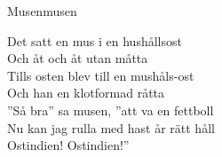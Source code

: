\begin{song}{Musen}{musen}
\begin{vers}
Det satt en mus i en hushållsost\\
Och åt och åt utan måtta\\
Tills osten blev till en mushåls-ost\\
Och han en klotformad råtta\\
''Så bra'' sa musen, ''att va en fettboll\\
Nu kan jag rulla med hast år rätt håll\\
Ostindien! Ostindien!''\\
\end{vers}
\end{song}
